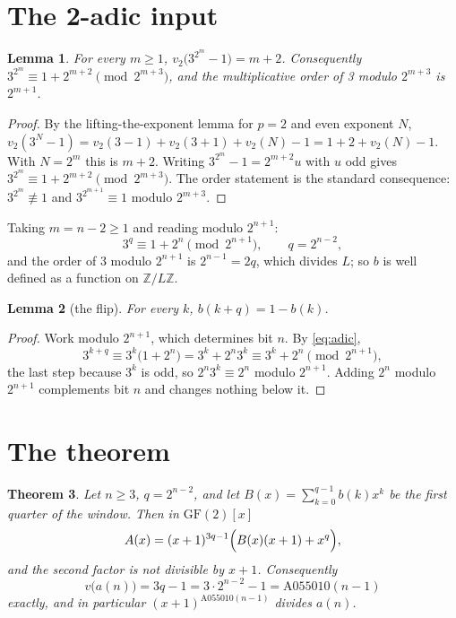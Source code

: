 \documentclass[11pt,a4paper]{article}
\theoremstyle{plain}
\newtheorem{theorem}{Theorem}
\newtheorem{lemma}[theorem]{Lemma}
\theoremstyle{definition}
\begin{document}
\section{The 2-adic input}

\begin{lemma}\label{lem:lte}
For every $m\ge1$, $v_{2}\bigl(3^{2^{m}}-1\bigr)=m+2$. Consequently
$3^{2^{m}}\equiv1+2^{m+2}\pmod{2^{m+3}}$, and the multiplicative order of 3 modulo
$2^{m+3}$ is $2^{m+1}$.
\end{lemma}

\begin{proof}
By the lifting-the-exponent lemma for $p=2$ and even exponent $N$,
$v_{2}(3^{N}-1)=v_{2}(3-1)+v_{2}(3+1)+v_{2}(N)-1=1+2+v_{2}(N)-1$. With $N=2^{m}$ this is
$m+2$. Writing $3^{2^{m}}-1=2^{m+2}u$ with $u$ odd gives
$3^{2^{m}}\equiv1+2^{m+2}\pmod{2^{m+3}}$. The order statement is the standard consequence:
$3^{2^{m}}\not\equiv1$ and $3^{2^{m+1}}\equiv1$ modulo $2^{m+3}$.
\end{proof}

Taking $m=n-2\ge1$ and reading modulo $2^{n+1}$:
\begin{equation}\label{eq:adic}
  3^{q}\equiv1+2^{n}\pmod{2^{n+1}},\qquad q=2^{n-2},
\end{equation}
and the order of 3 modulo $2^{n+1}$ is $2^{n-1}=2q$, which divides $L$; so $b$ is well
defined as a function on $\mathbb{Z}/L\mathbb{Z}$.

\begin{lemma}[the flip]\label{lem:flip}
For every $k$, $b(k+q)=1-b(k)$.
\end{lemma}

\begin{proof}
Work modulo $2^{n+1}$, which determines bit $n$. By \eqref{eq:adic},
\[
  3^{k+q}\equiv3^{k}\bigl(1+2^{n}\bigr)=3^{k}+2^{n}3^{k}\equiv3^{k}+2^{n}\pmod{2^{n+1}},
\]
the last step because $3^{k}$ is odd, so $2^{n}3^{k}\equiv2^{n}$ modulo $2^{n+1}$. Adding
$2^{n}$ modulo $2^{n+1}$ complements bit $n$ and changes nothing below it.
\end{proof}

\section{The theorem}

\begin{theorem}\label{thm:main}
Let $n\ge3$, $q=2^{n-2}$, and let $B(x)=\sum_{k=0}^{q-1}b(k)x^{k}$ be the first quarter of
the window. Then in $\mathrm{GF}(2)[x]$
\[
  A(x)=(x+1)^{3q-1}\Bigl(B(x)(x+1)+x^{q}\Bigr),
\]
and the second factor is not divisible by $x+1$. Consequently
\[
  v\bigl(a(n)\bigr)=3q-1=3\cdot2^{n-2}-1=\mathrm{A055010}(n-1)
\]
exactly, and in particular $(x+1)^{\mathrm{A055010}(n-1)}$ divides $a(n)$.
\end{theorem}
\end{document}
